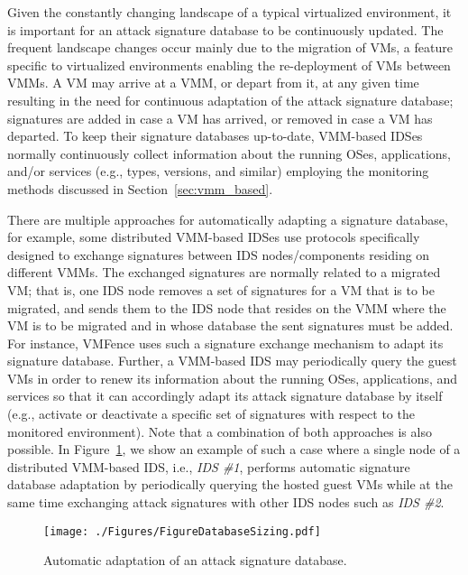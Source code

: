 Given the constantly changing landscape of a typical virtualized environment, it is important for an attack signature database to be continuously updated. The frequent landscape changes occur mainly due to the migration of VMs, a feature specific to virtualized environments enabling the re-deployment of VMs between VMMs. A VM may arrive at a VMM, or depart from it, at any given time resulting in the need for continuous adaptation of the attack signature database; signatures are added in case a VM has arrived, or removed in case a VM has departed. To keep their signature databases up-to-date, VMM-based IDSes normally continuously collect information about the running OSes, applications, and/or services (e.g., types, versions, and similar) employing the monitoring methods discussed in Section~\ref{sec:vmm_based}.

There are multiple approaches for automatically adapting a signature database, for example, some distributed VMM-based IDSes use protocols specifically designed to exchange signatures between IDS nodes/components residing on different VMMs. The exchanged signatures are normally related to a migrated VM; that is, one IDS node removes a set of signatures for a VM that is to be migrated, and sends them to the IDS node that resides on the VMM where the VM is to be migrated and in whose database the sent signatures must be added. For instance, VMFence \cite{hai:vmfence} uses such a signature exchange mechanism to adapt its signature database. Further, a VMM-based IDS may periodically query the guest VMs in order to renew its information about the running OSes, applications, and services so that it can accordingly adapt its attack signature database by itself (e.g., activate or deactivate a specific set of signatures with respect to the monitored environment). Note that a combination of both approaches is also possible. In Figure~\ref{fig:signature_database_sizing}, we show an example of such a case where a single node of a distributed VMM-based IDS, i.e., \emph{IDS \#1}, performs automatic signature database adaptation by periodically querying the hosted guest VMs while at the same time exchanging attack signatures with other IDS nodes such as \emph{IDS \#2}.

\begin{figure}[!t]
\centering
\texttt{[image: ./Figures/FigureDatabaseSizing.pdf]}
\caption{Automatic adaptation of an attack signature database.}
\label{fig:signature_database_sizing}
\end{figure} 

